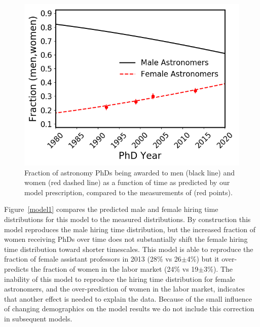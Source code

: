 \documentclass[modern]{aastex62}
\begin{document}
\begin{figure}[!hbt]
\center
\includegraphics[scale=.6]{f_phd.png}
\caption{Fraction of astronomy PhDs being awarded to men (black line) and women (red dashed line) as a function of time as predicted by our model prescription, compared to the measurements of \citet{hug14} (red points).\label{f_phd}}
\end{figure}

Figure~\ref{model1} compares the predicted male and female hiring time distributions for this model to the measured distributions. By construction this model reproduces the male hiring time distribution, but the increased fraction of women receiving PhDs over time does not substantially shift the female hiring time distribution toward shorter timescales. This model is able to reproduce the fraction of female assistant professors in 2013 (28\% vs 26$\pm$4\%) but it over-predicts the fraction of women in the labor market (24\% vs 19$\pm$3\%). The inability of this model to reproduce the hiring time distribution for female astronomers, and the over-prediction of women in the labor market, indicates that another effect is needed to explain the data. Because of the small influence of changing demographics on the model results we do not include this correction in subsequent models. 
\end{document}
